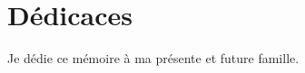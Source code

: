 \chapter*{Dédicaces}

\begin{center}
Je dédie ce mémoire \`a ma présente et future famille.
\end{center}
